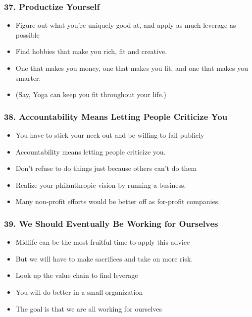 \begin{frame}[fragile]
\frametitle{37. Productize Yourself}
\begin{itemize}
\item Figure out what you're uniquely good at, and apply as much leverage as possible
\item Find hobbies that make you rich, fit and creative.
\item One that makes you money, one that makes you  fit, and one that
makes you smarter. 
\item (Say, Yoga can keep you fit throughout your life.)
\end{itemize}
\end{frame}

\begin{frame}[fragile]
\frametitle{38. Accountability Means Letting People Criticize You}
\begin{itemize}
\item You have to stick your neck out and be willing to fail publicly
\item Accountability means letting people criticize you.
\item Don't refuse to do things just because others can't do them
\item Realize your philanthropic vision by running a business.
\item Many non-profit efforts would be better off  as for-profit companies.
\end{itemize}
\end{frame}

\begin{frame}[fragile]
\frametitle{39. We Should Eventually Be Working for Ourselves}
\begin{itemize}
\item Midlife can be the most fruitful time to apply this advice
\item But we will have to make sacrifices and take on more risk.
\item Look up the value chain to find leverage
\item You will do better in a small organization
\item The goal is that we are all working for ourselves
\end{itemize}
\end{frame}

